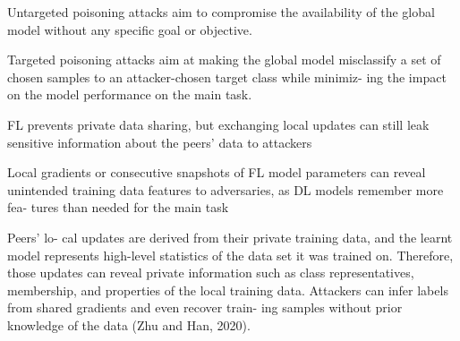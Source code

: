 Untargeted poisoning attacks aim to compromise the availability of the global 
model without any specific goal or objective.

Targeted poisoning attacks aim at making the global model misclassify a set 
of chosen samples to an attacker-chosen target class while minimiz- ing the 
impact on the model performance on the main task.

FL prevents private data sharing, but exchanging local updates can still leak 
sensitive information about the peers’ data to attackers

Local gradients or consecutive snapshots of FL model parameters can reveal 
unintended training data features to adversaries, as DL models remember more 
fea- tures than needed for the main task

Peers’ lo- cal updates are derived from their private training data, and the 
learnt model represents high-level statistics of the data set it was trained 
on. Therefore, those updates can reveal private information such as class 
representatives, membership, and properties of the local training data. 
Attackers can infer labels from shared gradients and even recover train- ing 
samples without prior knowledge of the data (Zhu and Han, 2020).





\pagebreak
